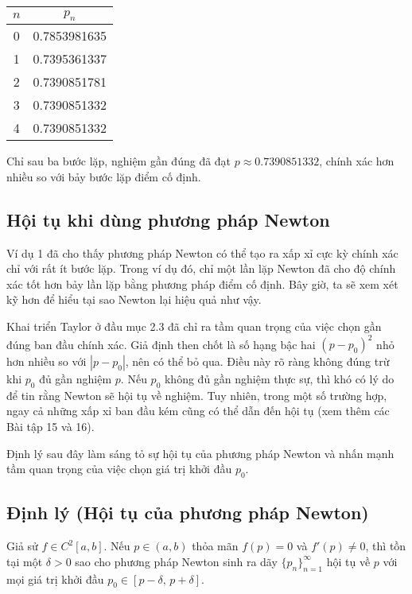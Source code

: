 \begin{center}
\label{tab:newton-cosx}
\begin{tabular}{|c|c|}
\hline
$n$ & $p_n$ \\
\hline
0 & 0.7853981635 \\
1 & 0.7395361337 \\
2 & 0.7390851781 \\
3 & 0.7390851332 \\
4 & 0.7390851332 \\
\hline
\end{tabular}
\end{center}

Chỉ sau ba bước lặp, nghiệm gần đúng đã đạt $p \approx 0.7390851332$, 
chính xác hơn nhiều so với bảy bước lặp điểm cố định.

\subsection*{Hội tụ khi dùng phương pháp Newton}

Ví dụ 1 đã cho thấy phương pháp Newton có thể tạo ra xấp xỉ cực kỳ chính xác chỉ với rất ít bước lặp. 
Trong ví dụ đó, chỉ một lần lặp Newton đã cho độ chính xác tốt hơn bảy lần lặp bằng phương pháp điểm cố định. 
Bây giờ, ta sẽ xem xét kỹ hơn để hiểu tại sao Newton lại hiệu quả như vậy.

Khai triển Taylor ở đầu mục 2.3 đã chỉ ra tầm quan trọng của việc chọn gần đúng ban đầu chính xác. 
Giả định then chốt là số hạng bậc hai $(p - p_0)^2$ nhỏ hơn nhiều so với $|p - p_0|$, 
nên có thể bỏ qua. Điều này rõ ràng không đúng trừ khi $p_0$ đủ gần nghiệm $p$. 
Nếu $p_0$ không đủ gần nghiệm thực sự, thì khó có lý do để tin rằng Newton sẽ hội tụ về nghiệm. 
Tuy nhiên, trong một số trường hợp, ngay cả những xấp xỉ ban đầu kém cũng có thể dẫn đến hội tụ 
(xem thêm các Bài tập 15 và 16).

Định lý sau đây làm sáng tỏ sự hội tụ của phương pháp Newton và nhấn mạnh tầm quan trọng 
của việc chọn giá trị khởi đầu $p_0$.

\subsection*{Định lý (Hội tụ của phương pháp Newton)}

Giả sử $f \in C^2[a,b]$. Nếu $p \in (a,b)$ thỏa mãn $f(p)=0$ và $f'(p) \neq 0$, 
thì tồn tại một $\delta > 0$ sao cho phương pháp Newton sinh ra dãy 
$\{p_n\}_{n=1}^\infty$ hội tụ về $p$ với mọi giá trị khởi đầu 
$p_0 \in [p-\delta,\, p+\delta]$.

